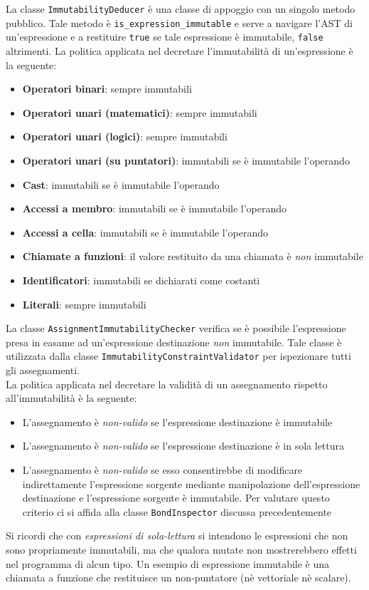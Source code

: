 \newpage

La classe \texttt{ImmutabilityDeducer} è una classe di appoggio con un singolo metodo pubblico. Tale metodo è 
\texttt{is\_expression\_immutable} e serve a navigare l'AST di un'espressione e a restituire \texttt{true} se
tale espressione è immutabile, \texttt{false} altrimenti. La politica applicata nel decretare l'immutabilità
di un'espressione è la seguente:

\begin{itemize}
    \item \textbf{Operatori binari}: sempre immutabili
    \item \textbf{Operatori unari (matematici)}: sempre immutabili
    \item \textbf{Operatori unari (logici)}: sempre immutabili
    \item \textbf{Operatori unari (su puntatori)}: immutabili se è immutabile l'operando
    \item \textbf{Cast}: immutabili se è immutabile l'operando
    \item \textbf{Accessi a membro}: immutabili se è immutabile l'operando
    \item \textbf{Accessi a cella}: immutabili se è immutabile l'operando
    \item \textbf{Chiamate a funzioni}: il valore restituito da una chiamata è \textit{non} immutabile
    \item \textbf{Identificatori}: immutabili se dichiarati come costanti
    \item \textbf{Literali}: sempre immutabili
\end{itemize}

La classe \texttt{AssignmentImmutabilityChecker} verifica se è possibile l'espressione presa in easame 
ad un'espressione destinazione \textit{non} immutabile. Tale classe è utilizzata dalla classe 
\texttt{ImmutabilityConstraintValidator} per ispezionare tutti gli assegnamenti. \\

La politica applicata nel decretare la validità di un assegnamento rispetto all'immutabilità è la seguente:

\begin{itemize}
    \item L'assegnamento è \textit{non-valido} se l'espressione destinazione è immutabile
    \item L'assegnamento è \textit{non-valido} se l'espressione destinazione è in sola lettura
    \item L'assegnamento è \textit{non-valido} se esso consentirebbe di modificare indirettamente 
    l'espressione sorgente mediante manipolazione dell'espressione destinazione e l'espressione sorgente 
    è immutabile. Per valutare questo criterio ci si affida alla classe \texttt{BondInspector} discussa 
    precedentemente
\end{itemize}

Si ricordi che con \textit{espressioni di sola-lettura} si intendono le espressioni che non sono propriamente 
immutabili, ma che qualora mutate non mostrerebbero effetti nel programma di alcun tipo. Un esempio di espressione 
immutabile è una chiamata a funzione che restituisce un non-puntatore (nè vettoriale nè scalare). \\
